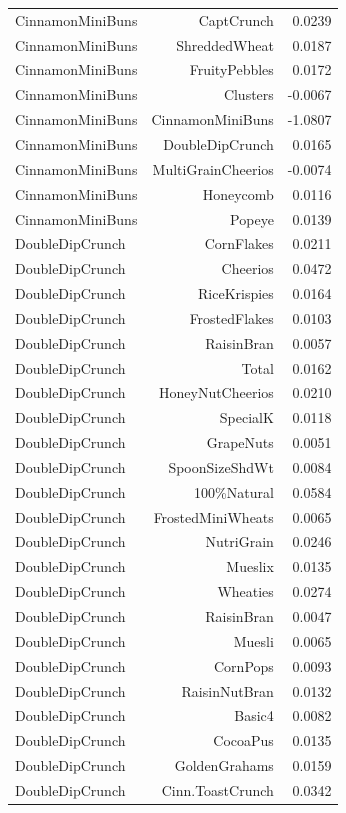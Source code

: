 \begin{longtable}{@{}lrr@{}}
CinnamonMiniBuns & CaptCrunch & 0.0239 \\
CinnamonMiniBuns & ShreddedWheat & 0.0187 \\
CinnamonMiniBuns & FruityPebbles & 0.0172 \\
CinnamonMiniBuns & Clusters & -0.0067 \\
CinnamonMiniBuns & CinnamonMiniBuns & -1.0807 \\
CinnamonMiniBuns & DoubleDipCrunch & 0.0165 \\
CinnamonMiniBuns & MultiGrainCheerios & -0.0074 \\
CinnamonMiniBuns & Honeycomb & 0.0116 \\
CinnamonMiniBuns & Popeye & 0.0139 \\
DoubleDipCrunch & CornFlakes & 0.0211 \\
DoubleDipCrunch & Cheerios & 0.0472 \\
DoubleDipCrunch & RiceKrispies & 0.0164 \\
DoubleDipCrunch & FrostedFlakes & 0.0103 \\
DoubleDipCrunch & RaisinBran & 0.0057 \\
DoubleDipCrunch & Total & 0.0162 \\
DoubleDipCrunch & HoneyNutCheerios & 0.0210 \\
DoubleDipCrunch & SpecialK & 0.0118 \\
DoubleDipCrunch & GrapeNuts & 0.0051 \\
DoubleDipCrunch & SpoonSizeShdWt & 0.0084 \\
DoubleDipCrunch & 100\%Natural & 0.0584 \\
DoubleDipCrunch & FrostedMiniWheats & 0.0065 \\
DoubleDipCrunch & NutriGrain & 0.0246 \\
DoubleDipCrunch & Mueslix & 0.0135 \\
DoubleDipCrunch & Wheaties & 0.0274 \\
DoubleDipCrunch & RaisinBran & 0.0047 \\
DoubleDipCrunch & Muesli & 0.0065 \\
DoubleDipCrunch & CornPops & 0.0093 \\
DoubleDipCrunch & RaisinNutBran & 0.0132 \\
DoubleDipCrunch & Basic4 & 0.0082 \\
DoubleDipCrunch & CocoaPus & 0.0135 \\
DoubleDipCrunch & GoldenGrahams & 0.0159 \\
DoubleDipCrunch & Cinn.ToastCrunch & 0.0342 \\

\end{longtable}
